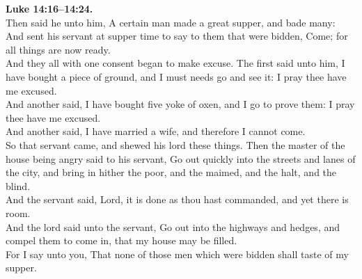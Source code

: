 \documentclass[14pt]{article} %
\begin{document}
{\begin{minipage}[t]{0.45\textwidth}
\textbf{Luke 14:16--14:24.}\\
Then said he unto him, A certain man made a great supper, and bade many:\\
And sent his servant at supper time to say to them that were bidden, Come; for all things are now ready.\\
And they all with one consent began to make excuse. The first said unto him, I have bought a piece of ground, and I must needs go and see it: I pray thee have me excused.\\
And another said, I have bought five yoke of oxen, and I go to prove them: I pray thee have me excused.\\
And another said, I have married a wife, and therefore I cannot come.\\
So that servant came, and shewed his lord these things. Then the master of the house being angry said to his servant, Go out quickly into the streets and lanes of the city, and bring in hither the poor, and the maimed, and the halt, and the blind.\\
And the servant said, Lord, it is done as thou hast commanded, and yet there is room.\\
And the lord said unto the servant, Go out into the highways and hedges, and compel them to come in, that my house may be filled.\\
For I say unto you, That none of those men which were bidden shall taste of my supper.\\

\end{minipage}}
\vspace*{\fill}
\newpage
\huge%
\vspace*{\fill}
\begin{spacing}{1.0}
\end{spacing}
\vspace*{\fill}
\end{document}
